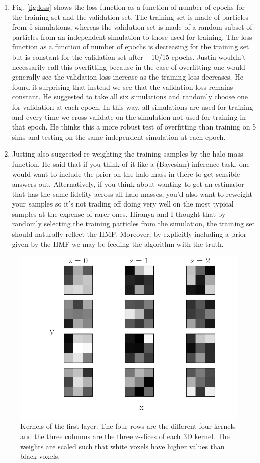 \documentclass[11pt]{article}
\begin{document}
\begin{enumerate}
\item Fig. \ref{fig:loss} shows the loss function as a function of number of epochs for the training set and the validation set. The training set is made of particles from $5$ simulations, whereas the validation set is made of a random subset of particles from an independent simulation to those used for training. The loss function as a function of number of epochs is decreasing for the training set but is constant for the validation set after ~ 10/15 epochs. Justin wouldn’t necessarily call this overfitting because in the case of overfitting one would generally see the validation loss increase as the training loss decreases. He found it surprising that instead we see that the validation loss remains constant. He suggested to take all six simulations and randomly choose one for validation at each epoch. In this way, all simulations are used for training and every time we cross-validate on the simulation not used for training in that epoch. He thinks this a more robust test of overfitting than training on 5 sims and testing on the same independent simulation at each epoch.
\item Justing also suggested re-weighting the training samples by the halo mass function. He said that if you think of it like a (Bayesian) inference task, one would want to include the prior on the halo mass in there to get sensible answers out. 
Alternatively, if you think about wanting to get an estimator that has the same fidelity across all halo masses, you’d also want to reweight your samples so it’s not trading off doing very well on the most typical samples at the expense of rarer ones. Hiranya and I thought that by randomly selecting the training particles from the simulation, the training set should naturally reflect the HMF. Moreover, by explicitly including a prior given by the HMF we may be feeding the algorithm with the truth.
\end{enumerate}

\begin{figure}[t]
\centering
\includegraphics[width=0.85\columnwidth]{kernels_first_layer.png}
\caption{Kernels of the first layer. The four rows are the different four kernels and the three columns are the three z-slices of each 3D kernel. The weights are scaled such that white voxels have higher values than black voxels.}
\label{fig:kernels_first_layer}
\end{figure}
\end{document}
